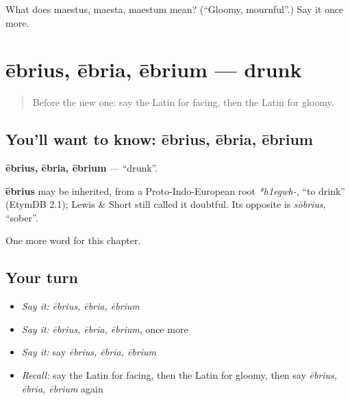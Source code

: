 \begin{tcolorbox}[breakable,colback=teal!4,colframe=teal!35!black,title={Before you move on}]
What does maestus, maesta, maestum mean? (\textquotedblleft{}Gloomy, mournful\textquotedblright{}.) Say it once more.
\end{tcolorbox}
\section[ēbrius, ēbria, ēbrium]{ēbrius, ēbria, ēbrium — drunk}

\label{lesson:LA-C269-ebrius}



\begin{quote}
Before the new one: say the Latin for facing, then the Latin for gloomy.
\end{quote}

\subsection*{You'll want to know: ēbrius, ēbria, ēbrium}
\textbf{ēbrius, ēbria, ēbrium} — \textquotedblleft{}drunk\textquotedblright{}.

\begin{cousinweb}
\textbf{ēbrius} may be inherited, from a Proto-Indo-European root \emph{*h1egwh-}, \textquotedblleft{}to drink\textquotedblright{} (EtymDB 2.1); Lewis \& Short still called it doubtful. Its opposite is \emph{sōbrius}, \textquotedblleft{}sober\textquotedblright{}.
\end{cousinweb}

\begin{grammarlens}[title={What you've built}]
One more word for this chapter.
\end{grammarlens}

\subsection*{Your turn}
\begin{itemize}
\raggedright
  \item \emph{Say it:} \emph{ēbrius, ēbria, ēbrium}
  \item \emph{Say it:} \emph{ēbrius, ēbria, ēbrium}, once more
  \item \emph{Say it:} say \emph{ēbrius, ēbria, ēbrium}
  \item \emph{Recall:} say the Latin for facing, then the Latin for gloomy, then say \emph{ēbrius, ēbria, ēbrium} again
\end{itemize}

